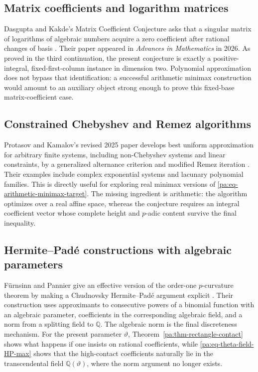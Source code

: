 \documentclass[11pt,oneside]{article}
\theoremstyle{definition}
\theoremstyle{remark}
\newcommand{\Q}{\mathbb Q}
\newcommand{\thetaq}{\vartheta}
\begin{document}
\subsection{Matrix coefficients and logarithm matrices}

Dasgupta and Kakde's Matrix Coefficient Conjecture asks that a singular matrix of logarithms of
algebraic numbers acquire a zero coefficient after rational changes of basis
\cite{DasguptaKakdeMCC}.  Their paper appeared in \emph{Advances in Mathematics} in 2026.  As
proved in the third continuation, the present conjecture is exactly a positive-integral,
fixed-first-column instance in dimension two.  Polynomial approximation does not bypass that
identification: a successful arithmetic minimax construction would amount to an auxiliary
object strong enough to prove this fixed-base matrix-coefficient case.

\subsection{Constrained Chebyshev and Remez algorithms}

Protasov and Kamalov's revised 2025 paper develops best uniform approximation for arbitrary
finite systems, including non-Chebyshev systems and linear constraints, by a generalized
alternance criterion and modified Remez iteration \cite{ProtasovKamalov}.  Their examples
include complex exponential systems and lacunary polynomial families.  This is directly useful
for exploring real minimax versions of \eqref{pa:eq-arithmetic-minimax-target}.  The missing
ingredient is arithmetic: the algorithm optimizes over a real affine space, whereas the
conjecture requires an integral coefficient vector whose complete height and \(p\)-adic
content survive the final inequality.

\subsection{Hermite--Pad\'e constructions with algebraic parameters}

F\"urnsinn and Pannier give an effective version of the order-one \(p\)-curvature theorem by
making a Chudnovsky Hermite--Pad\'e argument explicit \cite{FuernsinnPannier}.  Their
construction uses approximants to consecutive powers of a binomial function with an algebraic
parameter, coefficients in the corresponding algebraic field, and a norm from a splitting
field to \(\Q\).  The algebraic norm is the final discreteness mechanism.  For the present
parameter \(\thetaq\), Theorem~\ref{pa:thm-rectangle-contact} shows what happens if one insists
on rational coefficients, while \eqref{pa:eq-theta-field-HP-max} shows that the high-contact
coefficients naturally lie in the transcendental field \(\Q(\thetaq)\), where the norm
argument no longer exists.
\end{document}
